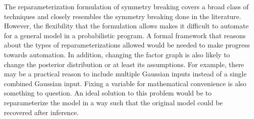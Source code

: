 The reparameterization formulation of symmetry breaking covers a broad class of techniques and closely resembles the symmetry breaking done in the literature. However, the flexibility that the formulation allows makes it difficult to automate for a general model in a probabilistic program. A formal framework that reasons about the types of reparameterizations allowed would be needed to make progress towards automation. In addition, changing the factor graph is also likely to change the posterior distribution or at least its assumptions. For example, there may be a practical reason to include multiple Gaussian inputs instead of a single combined Gaussian input. Fixing a variable for mathematical convenience is also something to question. An ideal solution to this problem would be to reparameterize the model in a way such that the original model could be recovered after inference.


